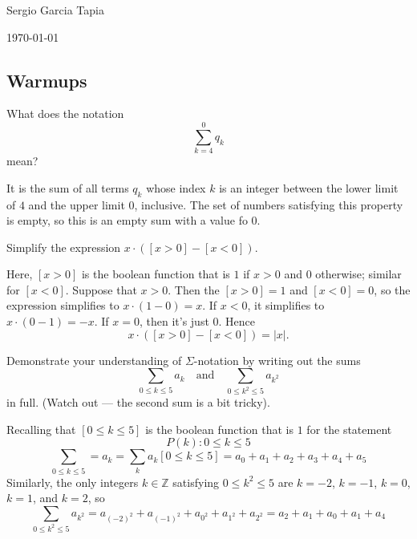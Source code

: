 \documentclass[12pt]{article}
\newenvironment{ex}[2][Exercise]{\begin{trivlist}
		\item[\hskip \labelsep {\bfseries #1}\hskip \labelsep {\bfseries #2.}]}{\end{trivlist}}
\newenvironment{sol}[1][Solution]{\begin{trivlist}
		\item[\hskip \labelsep {\bfseries #1:}]}{\end{trivlist}}
\begin{document}

\noindent Sergio Garcia Tapia \hfill

 \hfill 

 \hfill 

\noindent\today
\subsection*{Warmups}
\begin{ex}{1}
	What does the notation
	\[
	\sum_{k=4}^{0}q_k
	\]
	mean?
\end{ex}

\begin{sol}
	It is the sum of all terms $q_k$ whose index  $k$ is an integer between the lower limit of
	$4$ and the upper limit $0$, inclusive. The set of numbers satisfying this property is empty,
	so this is an empty sum with a value fo 0.
\end{sol}

\begin{ex}{2}
	Simplify the expression $x\cdot ([x>0]-[x<0])$.
\end{ex}

\begin{sol}
	Here, $[x>0]$ is the boolean function that is $1$ if $x>0$ and $0$ otherwise; similar for
	$[x<0]$. Suppose that $x>0$. Then the $[x>0]=1$ and $[x<0]=0$, so the expression simplifies
	to $x\cdot (1-0) = x$. If $x<0$, it simplifies to $x\cdot (0-1)=-x$. If $x=0$, then it's just 0.
	Hence
	\[
	x\cdot ([x>0]-[x<0])=|x|.
	\]
\end{sol}

\begin{ex}{3}
	Demonstrate your understanding of $\Sigma$-notation by writing out the sums
	\[
	\sum_{0\leq k \leq 5}a_k
	\quad\text{and}\quad
	\sum_{0\leq k^2\leq 5}a_{k^2}
	\]
	in full. (Watch out --- the second sum is a bit tricky).
\end{ex}

\begin{sol}
	Recalling that $[0\leq k\leq 5]$ is the boolean function that is $1$ for the
	statement
	\[
	P(k): 0\leq k \leq 5
	\]
	\[
	\sum_{0\leq k\leq 5}=a_k=\sum_{k}a_k[0\leq k\leq 5]=a_0+a_1+a_2+a_3+a_4+a_5
	\]
	Similarly, the only integers $k\in\mathbb{Z}$ satisfying $0\leq k^2\leq 5$ are
	$k=-2$, $k=-1$, $k=0$, $k=1$, and $k=2$, so
	\[
	\sum_{0\leq k^2\leq 5}a_{k^2}=a_{(-2)^2}+a_{(-1)^2}+a_{0^2}+a_{1^2}+a_{2^2}=a_2+a_1+a_0+a_1+a_4
	\]
\end{sol}
\end{document}

